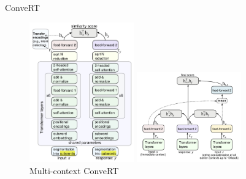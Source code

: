 \documentclass{beamer}
\begin{document}
\begin{frame}{ConveRT}
\begin{figure}[htbp]
\centering
\begin{minipage}[t]{0.48\textwidth}
\centering
\includegraphics[width=4.5cm]{ConveRT1.png}
\caption{Single-context ConveRT}
\end{minipage}
\begin{minipage}[t]{0.48\textwidth}
\centering
\includegraphics[width=4.5cm]{ConveRT2.png}
\caption{Multi-context ConveRT}
\end{minipage}
\end{figure}

\end{frame}
\end{document}
